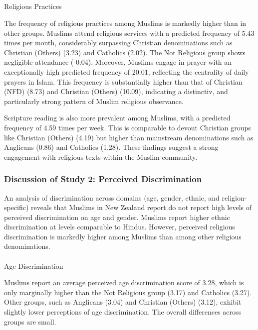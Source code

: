 \documentclass[
  single column]{article}
\makeatletter
\let\oldparagraph\paragraph
\renewcommand{\paragraph}{
    \@ifstar
      \xxxParagraphStar
      \xxxParagraphNoStar
  }
\newcommand{\xxxParagraphStar}[1]{\oldparagraph*{#1}\mbox{}}
\newcommand{\xxxParagraphNoStar}[1]{\oldparagraph{#1}\mbox{}}
\let\oldsubparagraph\subparagraph
\renewcommand{\subparagraph}{
    \@ifstar
      \xxxSubParagraphStar
      \xxxSubParagraphNoStar
  }
\newcommand{\xxxSubParagraphStar}[1]{\oldsubparagraph*{#1}\mbox{}}
\newcommand{\xxxSubParagraphNoStar}[1]{\oldsubparagraph{#1}\mbox{}}
\makeatother
\begin{document}
\subparagraph{Religious Practices}\label{religious-practices}

The frequency of religious practices among Muslims is markedly higher
than in other groups. Muslims attend religious services with a predicted
frequency of 5.43 times per month, considerably surpassing Christian
denominations such as Christian (Others) (3.23) and Catholics (2.02).
The Not Religious group shows negligible attendance (-0.04). Moreover,
Muslims engage in prayer with an exceptionally high predicted frequency
of 20.01, reflecting the centrality of daily prayers in Islam. This
frequency is substantially higher than that of Christian (NFD) (8.73)
and Christian (Others) (10.09), indicating a distinctiv, and
particularly strong pattern of Muslim religious observance.

Scripture reading is also more prevalent among Muslims, with a predicted
frequency of 4.59 times per week. This is comparable to devout Christian
groups like Christian (Others) (4.19) but higher than mainstream
denominations such as Anglicans (0.86) and Catholics (1.28). These
findings suggest a strong engagement with religious texts within the
Muslim community.

\subsubsection{Discussion of Study 2: Perceived
Discrimination}\label{discussion-of-study-2-perceived-discrimination}

An analysis of discrimination across domains (age, gender, ethnic, and
religion-specific) reveals that Muslims in New Zealand report do not
report high levels of perceived discrimination on age and gender.
Muslims report higher ethnic discrimination at levels comparable to
Hindus. However, perceived religious discrimination is markedly higher
among Muslims than among other religious denominations.

\paragraph{Age Discrimination}\label{age-discrimination}

Muslims report an average perceived age discrimination score of 3.28,
which is only marginally higher than the Not Religious group (3.17) and
Catholics (3.27). Other groups, such as Anglicans (3.04) and Christian
(Others) (3.12), exhibit slightly lower perceptions of age
discrimination. The overall differences across groups are small.
\end{document}
